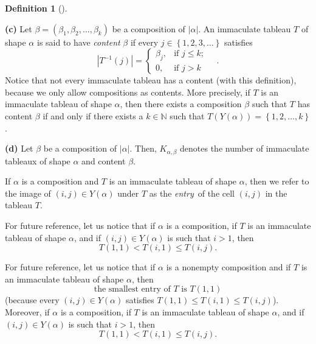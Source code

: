 \documentclass[numbers=enddot,12pt,final,onecolumn,notitlepage,abstracton]{scrartcl}%
\theoremstyle{definition}
\newtheorem{defi}[theo]{Definition}
\newenvironment{definition}[1][]
{\begin{defi}[#1]\begin{leftbar}}
{\end{leftbar}\end{defi}}
\newenvironment{verlong}{}{}
\newenvironment{vershort}{}{}
\newenvironment{noncompile}{}{}
\begin{document}
\begin{definition}
\textbf{(c)} Let $\beta=\left(  \beta_{1},\beta_{2},\ldots,\beta_{k}\right)  $
be a composition of $\left\vert \alpha\right\vert $. An immaculate tableau $T$
of shape $\alpha$ is said to have \textit{content }$\beta$ if every
$j\in\left\{  1,2,3,\ldots\right\}  $ satisfies%
\[
\left\vert T^{-1}\left(  j\right)  \right\vert =
\begin{cases}
\beta_{j}, & \text{if }j\leq k;\\
0, & \text{if }j>k
\end{cases}
\quad.
\]
Notice that not every immaculate tableau has a content (with this definition),
because we only allow compositions as contents. More precisely, if $T$ is an
immaculate tableau of shape $\alpha$, then there exists a composition $\beta$
such that $T$ has content $\beta$ if and only if there exists a $k\in
\mathbb{N}$ such that $T\left(  Y\left(  \alpha\right)  \right)  =\left\{
1,2,\ldots,k\right\}  $.

\textbf{(d)} Let $\beta$ be a composition of $\left\vert \alpha\right\vert $.
Then, $K_{\alpha,\beta}$ denotes the number of immaculate tableaux of shape
$\alpha$ and content $\beta$.
\end{definition}

\begin{noncompile}
If $\alpha$ is a composition and $T$ is an immaculate tableau of shape
$\alpha$, then we refer to the image of $\left(  i,j\right)  \in Y\left(
\alpha\right)  $ under $T$ as the \textit{entry}\ of the cell $\left(
i,j\right)  $ in the tableau $T$.
\end{noncompile}

\begin{vershort}
For future reference, let us notice that if $\alpha$ is a composition, if $T$
is an immaculate tableau of shape $\alpha$, and if $\left(  i,j\right)  \in
Y\left(  \alpha\right)  $ is such that $i>1$, then%
\begin{equation}
T\left(  1,1\right)  <T\left(  i,1\right)  \leq T\left(  i,j\right)  .
\label{eq.immactab.min.2.short}%
\end{equation}

\end{vershort}

\begin{verlong}
For future reference, let us notice that if $\alpha$ is a nonempty composition
and if $T$ is an immaculate tableau of shape $\alpha$, then%
\begin{equation}
\text{the smallest entry of }T\text{ is }T\left(  1,1\right)
\label{eq.immactab.min}%
\end{equation}
(because every $\left(  i,j\right)  \in Y\left(  \alpha\right)  $ satisfies
$T\left(  1,1\right)  \leq T\left(  i,1\right)  \leq T\left(  i,j\right)  $).
Moreover, if $\alpha$ is a composition, if $T$ is an immaculate tableau of
shape $\alpha$, and if $\left(  i,j\right)  \in Y\left(  \alpha\right)  $ is
such that $i>1$, then%
\begin{equation}
T\left(  1,1\right)  <T\left(  i,1\right)  \leq T\left(  i,j\right)  .
\label{eq.immactab.min.2}%
\end{equation}

\end{verlong}
\end{document}
